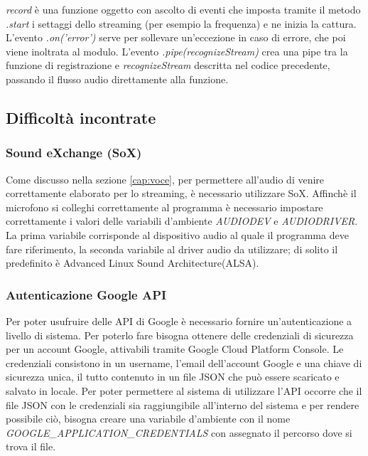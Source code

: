 \emph{record} \`e una funzione oggetto con ascolto di eventi che
imposta tramite il metodo \emph{.start} i settaggi dello streaming (per esempio la frequenza) e ne inizia la cattura.
L'evento \emph{.on('error')} serve per sollevare un'eccezione in caso di errore, che poi viene inoltrata al modulo.
L'evento \emph{.pipe(recognizeStream)} crea una pipe tra la funzione di registrazione e \emph{recognizeStream} descritta nel codice precedente,
passando il flusso audio direttamente alla funzione.

\subsection{Difficolt\`a incontrate}
\subsubsection{Sound eXchange (SoX)}\label{cap:sox}
Come discusso nella sezione \ref{cap:voce}, per permettere all'audio di venire correttamente elaborato
per lo streaming, \`e necessario utilizzare SoX.
Affinch\`e il microfono si colleghi correttamente al programma \`e necessario impostare correttamente
i valori delle variabili d'ambiente \textit{AUDIODEV} e \textit{AUDIODRIVER}.
La prima variabile corrisponde al dispositivo audio al quale il programma deve fare riferimento,
la seconda variabile al driver audio da utilizzare; di solito il predefinito \`e Advanced Linux Sound Architecture(ALSA).

\subsubsection{Autenticazione Google API}\label{cap:google}
Per poter usufruire delle API di Google \`e necessario fornire un'autenticazione a livello
di sistema.
Per poterlo fare bisogna ottenere delle credenziali di sicurezza per un account Google,
attivabili tramite Google Cloud Platform Console.
Le credenziali consistono in un username, l'email dell'account Google e una chiave di sicurezza unica,
 il tutto contenuto in un file JSON che pu\`o essere scaricato e salvato in locale.
Per poter permettere al sistema di utilizzare l'API occorre che il file JSON con le credenziali sia
raggiungibile all'interno del sistema e per rendere possibile ci\`o, bisogna creare una variabile d'ambiente con il nome
\textit{GOOGLE_APPLICATION_CREDENTIALS} con assegnato il percorso dove si trova il file.

